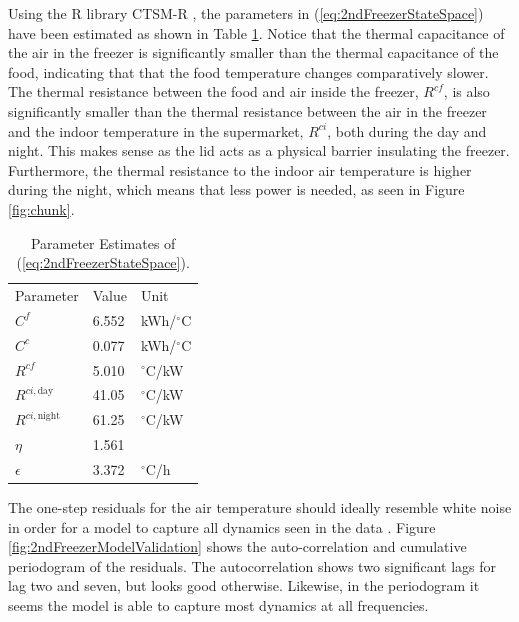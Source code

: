 Using the R library CTSM-R \cite{juhl2016ctsmr}, the parameters in (\ref{eq:2ndFreezerStateSpace}) have been estimated as shown in Table \ref{tab:parameter_estimates}. Notice that the thermal capacitance of the air in the freezer is significantly smaller than the thermal capacitance of the food, indicating that that the food temperature changes comparatively slower. The thermal resistance between the food and air inside the freezer, $R^{cf}$, is also significantly smaller than the thermal resistance between the air in the freezer and the indoor temperature in the supermarket, $R^{ci}$, both during the day and night. This makes sense as the lid acts as a physical barrier insulating the freezer. Furthermore, the thermal resistance to the indoor air temperature is higher during the night, which means that less power is needed, as seen in Figure \ref{fig:chunk}.

\begin{table}[!t]
    \caption{Parameter Estimates of (\ref{eq:2ndFreezerStateSpace}).}
    \label{tab:parameter_estimates}
    \centering
    \begin{tabular}[b]{|l|l|l|}
        \hline
        Parameter              & Value & Unit            \\ \hhline{|=|=|=|}
        $C^f$                  & 6.552 & kWh/$^{\circ}$C \\
        $C^c$                  & 0.077 & kWh/$^{\circ}$C \\
        $R^{cf}$               & 5.010 & $^{\circ}$C/kW  \\
        $R^{ci, \text{day}}$   & 41.05 & $^{\circ}$C/kW  \\
        $R^{ci, \text{night}}$ & 61.25 & $^{\circ}$C/kW  \\
        $\eta$                 & 1.561 &                 \\
        $\epsilon$             & 3.372 & $^{\circ}$C/h   \\ \hline
    \end{tabular}
\end{table}


The one-step residuals for the air temperature should ideally resemble white noise in order for a model to capture all dynamics seen in the data \cite{madsen2007time}. Figure \ref{fig:2ndFreezerModelValidation} shows the auto-correlation and cumulative periodogram of the residuals. The autocorrelation shows two significant lags for lag two and seven, but looks good otherwise. Likewise, in the periodogram it seems the model is able to capture most dynamics at all frequencies.

